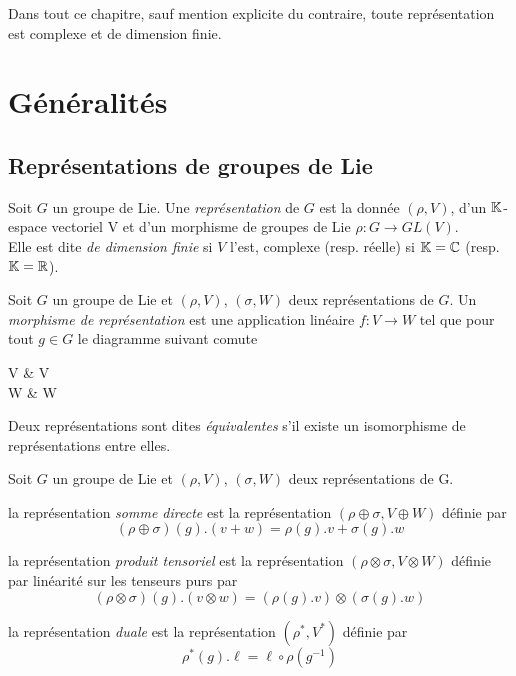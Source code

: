 
Dans tout ce chapitre, sauf mention explicite du contraire, toute représentation est complexe et de dimension finie.

\section{Généralités}

\subsection{Représentations de groupes de Lie}

\begin{definition}
    Soit $G$ un groupe de Lie. Une \emph{représentation} de $G$ est la donnée $(\rho, V)$, d'un $\mathbb{K}$-espace vectoriel V et d'un morphisme de groupes de Lie $\rho : G \to GL(V)$. \\
    Elle est dite \emph{de dimension finie} si $V$ l'est, complexe (resp. réelle) si $\mathbb{K} = \mathbb{C}$ (resp. $\mathbb{K} = \mathbb{R}$).
\end{definition}

\begin{definition}
    Soit $G$ un groupe de Lie et $(\rho, V)$, $(\sigma, W)$ deux représentations de $G$. Un \emph{morphisme de représentation} est une application linéaire $f: V \to W$ tel que pour tout $g\in G$ le diagramme suivant comute 
    \begin{diag}
        V \arrow[d, "f"] \arrow[r, "\rho(g)"] & V \arrow[d, "f"] \\
        W \arrow[r, "\sigma(g)"] & W
    \end{diag}
    Deux représentations sont dites \emph{équivalentes} s'il existe un isomorphisme de représentations entre elles.
\end{definition}

\begin{definition}
    Soit $G$ un groupe de Lie et $(\rho, V)$, $(\sigma, W)$ deux représentations de G. 
    \begin{ilist}
        \item la représentation \emph{somme directe} est la représentation $(\rho \oplus \sigma, V \oplus W)$ définie par 
        $$(\rho \oplus \sigma)(g).(v+w) = \rho(g).v  + \sigma(g).w$$
        \item la représentation \emph{produit tensoriel} est la représentation $(\rho \otimes \sigma, V \otimes W)$ définie par linéarité sur les tenseurs purs par
        $$(\rho \otimes \sigma)(g).(v\otimes w) = (\rho(g).v)\otimes(\sigma(g).w)$$
        \item la représentation \emph{duale} est la représentation $(\rho^*, V^*)$ définie par 
        $$\rho^*(g).\ell = \ell \circ \rho(g^{-1})$$
    \end{ilist}
\end{definition}

